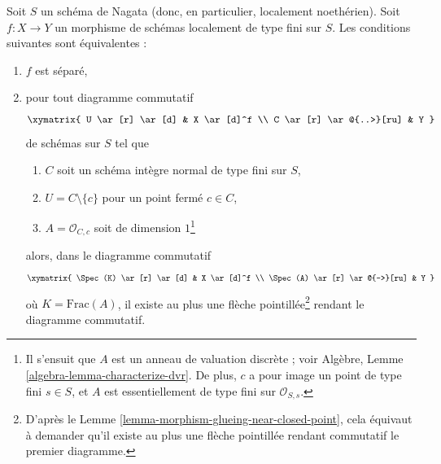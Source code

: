 \begin{lemma}
\label{lemma-essentially-finite-type-criterion-separation}
Soit $S$ un schéma de Nagata (donc, en particulier, localement noethérien).
Soit $f : X \to Y$ un morphisme de schémas localement de type fini sur $S$.
Les conditions suivantes sont équivalentes :
\begin{enumerate}
\item $f$ est séparé,
\item pour tout diagramme commutatif
$$
\xymatrix{
U \ar[r] \ar[d] & X \ar[d]^f \\
C \ar[r] \ar@{..>}[ru] & Y
}
$$
de schémas sur $S$ tel que
\begin{enumerate}
\item $C$ soit un schéma intègre normal de type fini sur $S$,
\item $U = C \setminus \{c\}$ pour un point fermé $c \in C$,
\item $A = \mathcal{O}_{C, c}$ soit de dimension $1$\footnote{Il s'ensuit
que $A$ est un anneau de valuation discrète ; voir
Algèbre, Lemme \ref{algebra-lemma-characterize-dvr}.
De plus, $c$ a pour image un point de type fini $s \in S$, et
$A$ est essentiellement de type fini sur $\mathcal{O}_{S, s}$.}
\end{enumerate}
alors, dans le diagramme commutatif
$$
\xymatrix{
\Spec(K) \ar[r] \ar[d] & X \ar[d]^f \\
\Spec(A) \ar[r] \ar@{-->}[ru] & Y
}
$$
où $K = \text{Frac}(A)$, il existe au plus une flèche pointillée\footnote{D'après le
Lemme \ref{lemma-morphism-glueing-near-closed-point}, cela
équivaut à demander qu'il existe au plus une flèche pointillée
rendant commutatif le premier diagramme.}
rendant le diagramme commutatif.
\end{enumerate}
\end{lemma}

